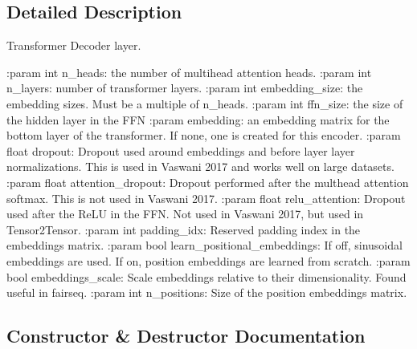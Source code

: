 \subsection{Detailed Description}
\begin{DoxyVerb}Transformer Decoder layer.

:param int n_heads: the number of multihead attention heads.
:param int n_layers: number of transformer layers.
:param int embedding_size: the embedding sizes. Must be a multiple of n_heads.
:param int ffn_size: the size of the hidden layer in the FFN
:param embedding: an embedding matrix for the bottom layer of the transformer.
    If none, one is created for this encoder.
:param float dropout: Dropout used around embeddings and before layer
    layer normalizations. This is used in Vaswani 2017 and works well on
    large datasets.
:param float attention_dropout: Dropout performed after the multhead attention
    softmax. This is not used in Vaswani 2017.
:param float relu_attention: Dropout used after the ReLU in the FFN. Not used
    in Vaswani 2017, but used in Tensor2Tensor.
:param int padding_idx: Reserved padding index in the embeddings matrix.
:param bool learn_positional_embeddings: If off, sinusoidal embeddings are
    used. If on, position embeddings are learned from scratch.
:param bool embeddings_scale: Scale embeddings relative to their dimensionality.
    Found useful in fairseq.
:param int n_positions: Size of the position embeddings matrix.
\end{DoxyVerb}
 

\subsection{Constructor \& Destructor Documentation}
\mbox{\label{classparlai_1_1agents_1_1transformer_1_1modules_1_1TransformerDecoder_ac9356241c0dd44bf980a155124cbde59}} 
